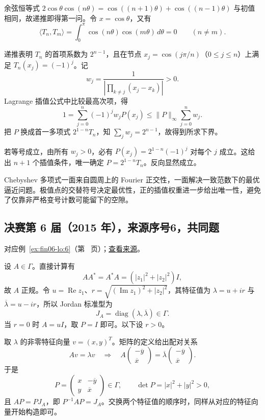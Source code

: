 \documentclass[12pt,fontset=fandol]{ctexart}
\begin{document}
\begin{solve}

余弦恒等式
$2\cos\theta\cos(n\theta)=\cos((n+1)\theta)+\cos((n-1)\theta)$
与初值相同，故递推即得第一问。令 $x=\cos\theta$，又有
\[
\langle T_n,T_m\rangle=\int_0^\pi\cos(n\theta)\cos(m\theta)\,d\theta=0
\qquad(n\ne m).
\]

递推表明 $T_n$ 的首项系数为 $2^{n-1}$，且在节点 $x_j=\cos(j\pi/n)$（$0\le j\le n$）上满足 $T_n(x_j)=(-1)^j$。记
\[
w_j=\frac1{\left|\prod_{k\ne j}(x_j-x_k)\right|}>0.
\]
Lagrange 插值公式中比较最高次项，得
\[
1=\sum_{j=0}^n(-1)^jw_jP(x_j)
\le\|P\|_\infty\sum_{j=0}^n w_j.
\]
把 $P$ 换成首一多项式 $2^{1-n}T_n$，知 $\sum_jw_j=2^{n-1}$，故得到所求下界。

若等号成立，由所有 $w_j>0$，必有 $P(x_j)=2^{1-n}(-1)^j$ 对每个 $j$ 成立。这给出 $n+1$ 个插值条件，唯一确定 $P=2^{1-n}T_n$。反向显然成立。

\end{solve}

\begin{remark}[方法与条件]

Chebyshev 多项式一面来自圆周上的 Fourier 正交性，一面解决一致范数下的最优逼近问题。极值点的交替符号决定最优性，正的插值权重进一步给出唯一性，避免了仅靠非严格变号计数可能留下的空隙。

\end{remark}

\subsection{决赛第 6 届（2015 年），来源序号6，共同题}\label{ans:fin06-lo:6}\label{pr:fin06-lo:6}

对应例~\ref{ex:fin06-lo:6}（第~\pageref{ex:fin06-lo:6} 页）；\href{https://github.com/lzxcr/cmc-mathematics/blob/64916fa1fdbc3e444a652eca204d5669058ee321/src/problems/finals/06/06.md}{查看来源}。

\begin{solve}

设 $A\in\Gamma$。直接计算有
\[
AA^*=A^*A=(|z_1|^2+|z_2|^2)I,
\]
故 $A$ 正规。令 $u=\operatorname{Re}z_1$、$r=\sqrt{(\operatorname{Im}z_1)^2+|z_2|^2}$，其特征值为 $\lambda=u+ir$ 与 $\overline\lambda=u-ir$，所以 Jordan 标准型为
\[
J_A=\operatorname{diag}(\lambda,\overline\lambda)\in\Gamma.
\]
当 $r=0$ 时 $A=uI$，取 $P=I$ 即可。以下设 $r>0$。

取 $\lambda$ 的非零特征向量 $v=(x,y)^T$。矩阵的定义给出配对关系
\[
Av=\lambda v
\quad\Longrightarrow\quad
A\begin{pmatrix}-\overline y\\\overline x\end{pmatrix}
=\overline\lambda\begin{pmatrix}-\overline y\\\overline x\end{pmatrix}.
\]
于是
\[
P=\begin{pmatrix}x&-\overline y\\y&\overline x\end{pmatrix}\in\Gamma,
\qquad \det P=|x|^2+|y|^2>0,
\]
且 $AP=PJ_A$，即 $P^{-1}AP=J_A$。交换两个特征值的顺序时，同样从对应的特征向量开始构造即可。

\end{solve}
\end{document}
